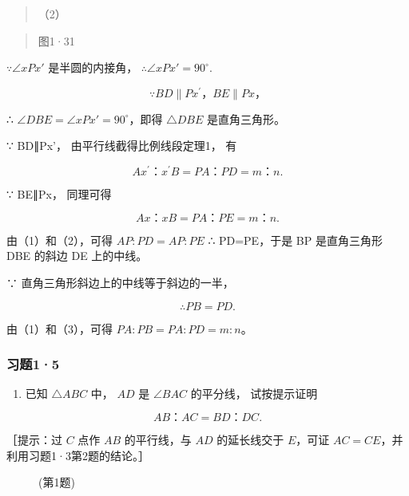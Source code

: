 \begin{quote}
（2）
\end{quote}

\begin{quote}
图1·31
\end{quote}

\(\because \angle xPx'\) 是半圆的内接角，
\(\therefore \angle xPx' = 90^{\circ}.\)

\[
\because B D \parallel P x ^ {\prime}\text{，} B E \parallel P x\text{，}
\]

∴ \(\angle DBE = \angle xPx' = 90^{\circ}\)，即得 \(\triangle DBE\)
是直角三角形。

∵ BD∥Px'， 由平行线截得比例线段定理1， 有

\[
A x ^ {\prime}\text{：} x ^ {\prime} B = P A\text{：} P D = m\text{：} n. \tag {1}
\]

∵ BE∥Px， 同理可得

\[
A x\text{：} x B = P A\text{：} P E = m\text{：} n. \tag {2}
\]

由（1）和（2），可得 \(AP:PD = AP:PE\) ∴ PD=PE，于是 BP 是直角三角形 DBE
的斜边 DE 上的中线。

∵ 直角三角形斜边上的中线等于斜边的一半，

\[
\therefore P B = P D. \tag {3}
\]

由（1）和（3），可得 \(PA:PB=PA:PD=m:n\)。

\subsubsection{习题1·5}

\begin{enumerate}
\item
  已知 \(\triangle ABC\) 中， \(AD\) 是 \(\angle BAC\) 的平分线，
  试按提示证明
\end{enumerate}

\[
A B\text{：} A C = B D\text{：} D C.
\]

［提示：过 \(C\) 点作 \(AB\) 的平行线，与 \(AD\) 的延长线交于
\(E\)，可证 \(AC = CE\)，并利用习题1·3第2题的结论。］

\begin{figure}
\centering
{}
\caption{(第1题)}
\end{figure}

